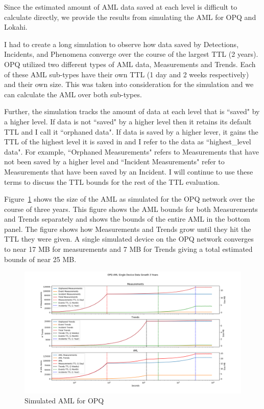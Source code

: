 Since the estimated amount of AML data saved at each level is difficult to calculate directly, we provide the results from simulating the AML for OPQ and Lokahi.

I had to create a long simulation to observe how data saved by Detections, Incidents, and Phenomena converge over the course of the largest TTL (2 years). OPQ utilized two different types of AML data, Measurements and Trends. Each of these AML sub-types have their own TTL (1 day and 2 weeks respectively) and their own size. This was taken into consideration for the simulation and we can calculate the AML over both sub-types.

Further, the simulation tracks the amount of data at each level that is ``saved" by a higher level. If data is not ``saved" by a higher level then it retains its default TTL and I call it ``orphaned data". If data is saved by a higher lever, it gains the TTL of the highest level it is saved in and I refer to the data as ``highest\_level data". For example, ``Orphaned Measurements" refers to Measurements that have not been saved by a higher level and ``Incident Measurements" refer to Measurements that have been saved by an Incident. I will continue to use these terms to discuss the TTL bounds for the rest of the TTL evaluation.

Figure~\ref{fig:sim_aml_opq} shows the size of the AML as simulated for the OPQ network over the course of three years. This figure shows the AML bounds for both Measurements and Trends separately and shows the bounds of the entire AML in the bottom panel. The figure shows how Measurements and Trends grow until they hit the TTL they were given. A single simulated device on the OPQ network converges to near 17 MB for measurements and 7 MB for Trends giving a total estimated bounds of near 25 MB.

\begin{figure}[H]
	\centering
	\includegraphics[width=\linewidth]{figures/sim_aml_opq.png}
	\caption{Simulated AML for OPQ}
	\label{fig:sim_aml_opq}
\end{figure}

